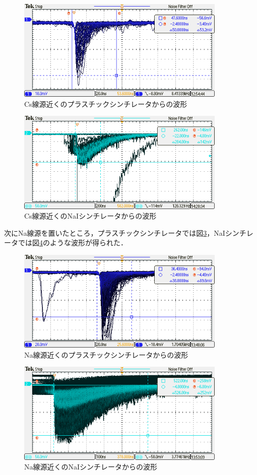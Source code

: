 \documentclass[a4paper,11pt]{jsarticle}
\begin{document}
\begin{figure}[htbp]
  \centering
  \includegraphics[width=10cm]{TEK00735.png}
  \caption{Cs線源近くのプラスチックシンチレータからの波形}
  \label{fig:cs_pla}
\end{figure}

\begin{figure}[htbp]
  \centering
  \includegraphics[width=10cm]{TEK00745.png}
  \caption{Cs線源近くのNaIシンチレータからの波形}
  \label{fig:cs_nai}
\end{figure}

次にNa線源を置いたところ，プラスチックシンチレータでは図\ref{fig:na_pla}，NaIシンチレータでは図\ref{fig:na_nai}のような波形が得られた．

\begin{figure}[htbp]
  \centering
  \includegraphics[width=10cm]{TEK00741.png}
  \caption{Na線源近くのプラスチックシンチレータからの波形}
  \label{fig:na_pla}
\end{figure}

\begin{figure}[htbp]
  \centering
  \includegraphics[width=10cm]{TEK00742.png}
  \caption{Na線源近くのNaIシンチレータからの波形}
  \label{fig:na_nai}
\end{figure}
\end{document}
